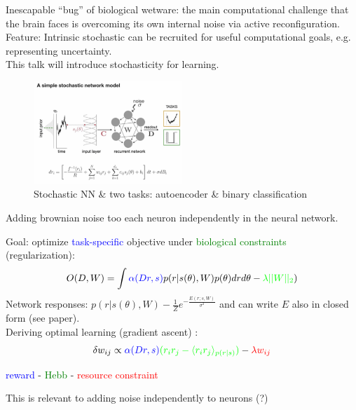 \documentclass[12pt]{article}
\begin{document}
Inescapable ``bug'' of biological wetware: the main computational challenge that the brain faces is overcoming its own internal noise via active reconfiguration. \\

Feature: Intrinsic stochastic can be recruited for useful computational goals, e.g. representing uncertainty.  \\

This talk will introduce stochasticity for learning. 
\begin{figure}
  \centering
      \includegraphics[width=0.5\textwidth]{images/stochnn.png}
  \caption{Stochastic NN \& two tasks: autoencoder \& binary classification}
\end{figure}

Adding brownian noise too each neuron independently in the neural network.

Goal: optimize \textcolor{blue}{task-specific} objective under \textcolor{green}{biological constraints} (regularization):
$$
O(D,W) = \int \textcolor{blue}{\alpha(Dr, s)}p(r|s(\theta),W)p(\theta)drd\theta - \textcolor{green}{\lambda ||W||_2})
$$
Network responses: $p(r|s(\theta),W) - \frac{1}{Z}e^{-\frac{E(r;s,W)}{\sigma^2}}$ and can write $E$ also in closed form (see paper). \\

Deriving optimal learning (gradient ascent) \cite{Williams1992, Fiete2006, Fiete2007, Scellier16, Miconi2017}:
$$
\delta w_{ij} \propto \textcolor{blue}{\alpha(Dr,s)}\textcolor{green}{(r_ir_j - \langle r_ir_j \rangle_{p(r|s)})} - \textcolor{red}{\lambda w_{ij}}
$$
\begin{center}
\textcolor{blue}{reward} - \textcolor{green}{Hebb} - \textcolor{red}{resource constraint}
\end{center}

This is relevant to adding noise independently to neurons (?) \\
\end{document}
